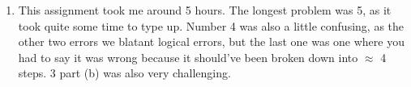 \documentclass[12pt]{article}
\theoremstyle{definition}
\theoremstyle{remark}
\begin{document}
\begin{enumerate}[leftmargin=\labelsep]
		\newpage
		\item[7.] This assignment took me around 5 hours. The longest problem was 5, as it took quite some time to type up. Number 4 was also a little confusing, as the other two errors we blatant logical errors, but the last one was one where you had to say it was wrong because it should've been broken down into $\approx$ 4 steps. 3 part (b) was also very challenging.
	\end{enumerate}
\end{document}
